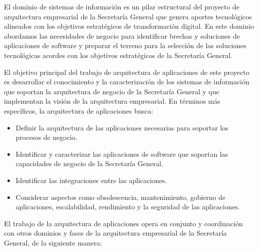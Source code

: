 \documentclass[
	a4paper, %
	12pt, %
]{include/CSSullivanBusinessReport}
\def\tightlist{}
\begin{document}
El dominio de sistemas de información es un pilar estructural del
proyecto de arquitectura empresarial de la Secretaría General que genera
aportes tecnológicos alineados con los objetivos estratégicos de
transformación digital. En este dominio abordamos las necesidades de
negocio para identificar brechas y soluciones de aplicaciones de
software y preparar el terreno para la selección de las soluciones
tecnológicas acordes con los objetivos estratégicos de la Secretaría
General.

El objetivo principal del trabajo de arquitectura de aplicaciones de
este proyecto es desarrollar el conocimiento y la caracterización de los
sistemas de información que soportan la arquitectura de negocio de la
Secretaría General y que implementan la visión de la arquitectura
empresarial. En términos más específicos, la arquitectura de
aplicaciones busca:

\begin{itemize}
\tightlist
\item
  Definir la arquitectura de las aplicaciones necesarias para soportar
  los procesos de negocio.
\item
  Identificar y caracterizar las aplicaciones de software que soportan
  las capacidades de negocio de la Secretaría General.
\item
  Identificar las integraciones entre las aplicaciones.
\item
  Considerar aspectos como obsolescencia, mantenimiento, gobierno de
  aplicaciones, escalabilidad, rendimiento y la seguridad de las
  aplicaciones.
\end{itemize}

El trabajo de la arquitectura de aplicaciones opera en conjunto y
coordinación con otros dominios y fases de la arquitectura empresarial
de la Secretaría General, de la siguiente manera:
\end{document}
